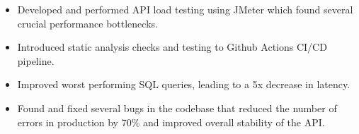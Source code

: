 \begin{itemize}
    \item Developed and performed API load testing using JMeter which found several crucial performance bottlenecks.
    \item Introduced static analysis checks and testing to Github Actions CI/CD pipeline.
    \item Improved worst performing SQL queries, leading to a 5x decrease in latency.
    \item Found and fixed several bugs in the codebase that reduced the number of errors in production by 70\%  
    and improved overall stability of the API.
\end{itemize}